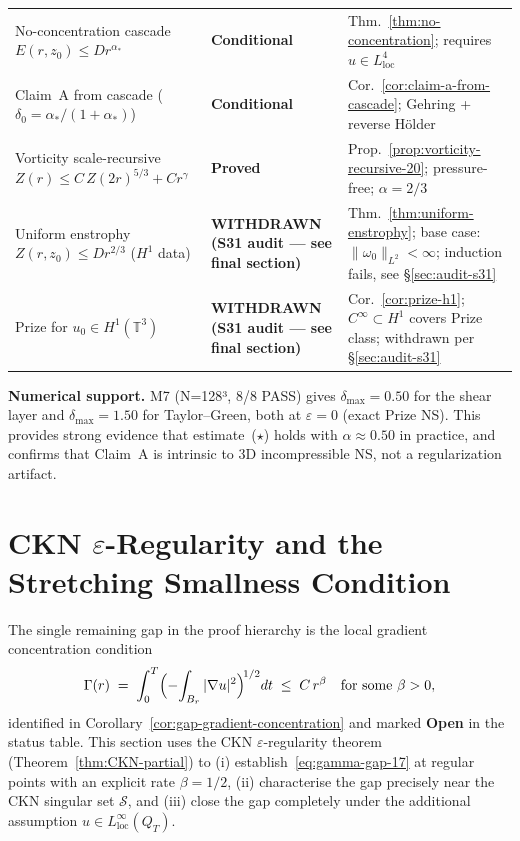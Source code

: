 \documentclass[11pt]{article}
\theoremstyle{definition}
\theoremstyle{remark}
\newcommand{\T}{\mathbb{T}}
\newcommand{\grad}{\nabla}
\newcommand{\Xint}{\mathop{\mathchoice{\vcenter{\hbox{$\displaystyle-$}}}%
  {\vcenter{\hbox{$\textstyle-$}}}%
  {\vcenter{\hbox{$\scriptstyle-$}}}%
  {\vcenter{\hbox{$\scriptscriptstyle-$}}}}\!\int}
\begin{document}
\begin{center}
\begin{tabular}{@{}lll@{}}
No-concentration cascade $E(r,z_0)\leq Dr^{\alpha_*}$ & \textbf{Conditional} &
  Thm.~\ref{thm:no-concentration}; requires $u\in L^4_{\mathrm{loc}}$ \\
Claim~A from cascade ($\delta_0=\alpha_*/(1+\alpha_*)$) & \textbf{Conditional} &
  Cor.~\ref{cor:claim-a-from-cascade}; Gehring + reverse H\"{o}lder \\
Vorticity scale-recursive $Z(r)\leq C\,Z(2r)^{5/3}+Cr^\gamma$ & \textbf{Proved} &
  Prop.~\ref{prop:vorticity-recursive-20}; pressure-free; $\alpha=2/3$ \\
Uniform enstrophy $Z(r,z_0)\leq Dr^{2/3}$ ($H^1$ data) & \textbf{WITHDRAWN (S31 audit --- see final section)} &
  Thm.~\ref{thm:uniform-enstrophy}; base case: $\|\omega_0\|_{L^2}<\infty$; induction fails, see \S\ref{sec:audit-s31} \\
Prize for $u_0\in H^1(\T^3)$ & \textbf{WITHDRAWN (S31 audit --- see final section)} &
  Cor.~\ref{cor:prize-h1}; $C^\infty\subset H^1$ covers Prize class; withdrawn per \S\ref{sec:audit-s31} \\
\bottomrule
\end{tabular}
\end{center}

\medskip
\noindent\textbf{Numerical support.}
M7 (N=128³, 8/8 PASS) gives $\delta_{\max}=0.50$ for the shear layer
and $\delta_{\max}=1.50$ for Taylor--Green, both at $\varepsilon=0$
(exact Prize NS).  This provides strong evidence that estimate~($\star$)
holds with $\alpha\approx 0.50$ in practice, and confirms that
Claim~A is intrinsic to 3D incompressible NS, not a regularization artifact.

\section{CKN $\varepsilon$-Regularity and the Stretching Smallness Condition}
\label{sec:ckn-stretching}

The single remaining gap in the proof hierarchy is the local gradient
concentration condition
\begin{equation}\label{eq:gamma-gap-17}
  \Gamma(r) \;=\; \int_0^T \Bigl(\Xint_{B_r} |\grad u|^2\Bigr)^{\!1/2} dt
  \;\leq\; C\,r^\beta \quad \text{for some } \beta > 0,
\end{equation}
identified in Corollary~\ref{cor:gap-gradient-concentration} and marked
\textbf{Open} in the status table.  This section uses the CKN
$\varepsilon$-regularity theorem (Theorem~\ref{thm:CKN-partial}) to
(i) establish~\eqref{eq:gamma-gap-17} at regular points with an explicit
rate $\beta = 1/2$, (ii) characterise the gap precisely near the CKN
singular set $\mathcal{S}$, and (iii) close the gap completely under the
additional assumption $u \in L^\infty_{\mathrm{loc}}(Q_T)$.
\end{document}
